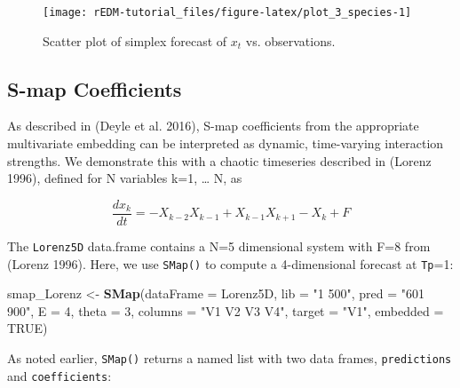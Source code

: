 \documentclass[]{article}
\newenvironment{Shaded}{\begin{snugshade}}{\end{snugshade}}
\newcommand{\DataTypeTok}[1]{\textcolor[rgb]{0.13,0.29,0.53}{#1}}
\newcommand{\DecValTok}[1]{\textcolor[rgb]{0.00,0.00,0.81}{#1}}
\newcommand{\KeywordTok}[1]{\textcolor[rgb]{0.13,0.29,0.53}{\textbf{#1}}}
\newcommand{\NormalTok}[1]{#1}
\newcommand{\OperatorTok}[1]{\textcolor[rgb]{0.81,0.36,0.00}{\textbf{#1}}}
\newcommand{\OtherTok}[1]{\textcolor[rgb]{0.56,0.35,0.01}{#1}}
\newcommand{\StringTok}[1]{\textcolor[rgb]{0.31,0.60,0.02}{#1}}
\begin{document}
\begin{figure}[h]

{\centering \texttt{[image: rEDM-tutorial\_files/figure-latex/plot\_3\_species-1]} 

}

\caption{Scatter plot of simplex forecast of $x_t$ vs. observations.}\label{fig:plot_3_species}
\end{figure}

\hypertarget{s-map-coefficients}{%
\subsection{S-map Coefficients}\label{s-map-coefficients}}

As described in (Deyle et al. 2016), S-map coefficients from the
appropriate multivariate embedding can be interpreted as dynamic,
time-varying interaction strengths. We demonstrate this with a chaotic
timeseries described in (Lorenz 1996), defined for N variables k=1,
\ldots{} N, as

\begin{equation*}
  \frac{ dx_{k} }{ dt } = -X_{k-2} X_{k-1} + X_{k-1} X_{k+1} - X_k + F
\end{equation*}

The \texttt{Lorenz5D} data.frame contains a N=5 dimensional system with
F=8 from (Lorenz 1996). Here, we use \texttt{SMap()} to compute a
4-dimensional forecast at \texttt{Tp}=1:

\begin{Shaded}
\begin{Highlighting}[]
\NormalTok{smap_Lorenz <-}\StringTok{ }\KeywordTok{SMap}\NormalTok{(}\DataTypeTok{dataFrame =}\NormalTok{ Lorenz5D, }\DataTypeTok{lib =} \StringTok{"1 500"}\NormalTok{, }\DataTypeTok{pred =} \StringTok{"601 900"}\NormalTok{, }\DataTypeTok{E =} \DecValTok{4}\NormalTok{, }
    \DataTypeTok{theta =} \DecValTok{3}\NormalTok{, }\DataTypeTok{columns =} \StringTok{"V1 V2 V3 V4"}\NormalTok{, }\DataTypeTok{target =} \StringTok{"V1"}\NormalTok{, }\DataTypeTok{embedded =} \OtherTok{TRUE}\NormalTok{)}
\end{Highlighting}
\end{Shaded}

As noted earlier, \texttt{SMap()} returns a named list with two data
frames, \texttt{predictions} and \texttt{coefficients}:

\begin{Shaded}
\end{Shaded}
\end{document}
